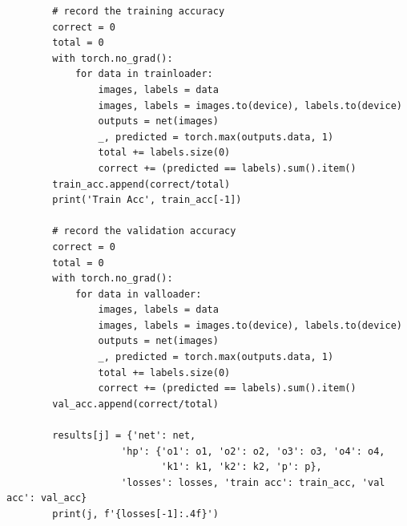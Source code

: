 \documentclass{article}
\begin{document}
\begin{enumerate}
\begin{verbatim}
        # record the training accuracy
        correct = 0
        total = 0
        with torch.no_grad():
            for data in trainloader:
                images, labels = data
                images, labels = images.to(device), labels.to(device)
                outputs = net(images)
                _, predicted = torch.max(outputs.data, 1)
                total += labels.size(0)
                correct += (predicted == labels).sum().item()
        train_acc.append(correct/total)
        print('Train Acc', train_acc[-1])

        # record the validation accuracy
        correct = 0
        total = 0
        with torch.no_grad():
            for data in valloader:
                images, labels = data
                images, labels = images.to(device), labels.to(device)
                outputs = net(images)
                _, predicted = torch.max(outputs.data, 1)
                total += labels.size(0)
                correct += (predicted == labels).sum().item()
        val_acc.append(correct/total)

        results[j] = {'net': net,
                    'hp': {'o1': o1, 'o2': o2, 'o3': o3, 'o4': o4,
                           'k1': k1, 'k2': k2, 'p': p},
                    'losses': losses, 'train acc': train_acc, 'val acc': val_acc}
        print(j, f'{losses[-1]:.4f}')
        \end{verbatim}


\end{enumerate}
\end{document}
